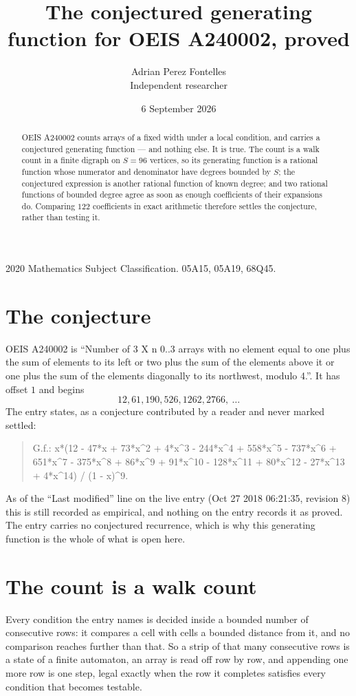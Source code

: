 \documentclass[11pt,a4paper]{article}
\title{The conjectured generating function for OEIS A240002, proved}
\author{Adrian Perez Fontelles\\ \small Independent researcher}
\date{6 September 2026}
\theoremstyle{plain}
\theoremstyle{definition}
\begin{document}
\maketitle

\begin{abstract}
OEIS A240002 counts arrays of a fixed width under a local condition, and carries a conjectured
generating function --- and nothing else. It is true. The count is a walk count in a finite
digraph on $S=96$ vertices, so its generating function is a rational function whose numerator
and denominator have degrees bounded by $S$; the conjectured expression is another rational
function of known degree; and two rational functions of bounded degree agree as soon as enough
coefficients of their expansions do. Comparing $122$ coefficients in exact arithmetic
therefore settles the conjecture, rather than testing it.
\end{abstract}

\noindent\small 2020 Mathematics Subject Classification. 05A15, 05A19, 68Q45.\normalsize

\section{The conjecture}

OEIS A240002 is ``Number of 3 X n 0..3 arrays with no element equal to one plus the sum of elements to its left or two plus the sum of the elements above it or one plus the sum of the elements diagonally to its northwest, modulo 4.''. It has offset $1$ and begins
\[
12, 61, 190, 526, 1262, 2766,\ \dots
\]
The entry states, as a conjecture contributed by a reader and never marked settled:
\begin{quote}
G.f.: x*(12 - 47*x + 73*x\^{}2 + 4*x\^{}3 - 244*x\^{}4 + 558*x\^{}5 - 737*x\^{}6 + 651*x\^{}7 - 375*x\^{}8 + 86*x\^{}9 + 91*x\^{}10 - 128*x\^{}11 + 80*x\^{}12 - 27*x\^{}13 + 4*x\^{}14) / (1 - x)\^{}9.
\end{quote}
As of the ``Last modified'' line on the live entry (Oct 27 2018 06:21:35, revision 8) this is still
recorded as empirical, and nothing on the entry records it as proved. The entry carries no
conjectured recurrence, which is why this generating function is the whole of what is open
here.

\section{The count is a walk count}

Every condition the entry names is decided inside a bounded number of consecutive rows: it
compares a cell with cells a bounded distance from it, and no comparison reaches further than
that. So a strip of that many consecutive rows is a state of a finite automaton, an array is
read off row by row, and appending one more row is one step, legal exactly when the row it
completes satisfies every condition that becomes testable.
\end{document}
